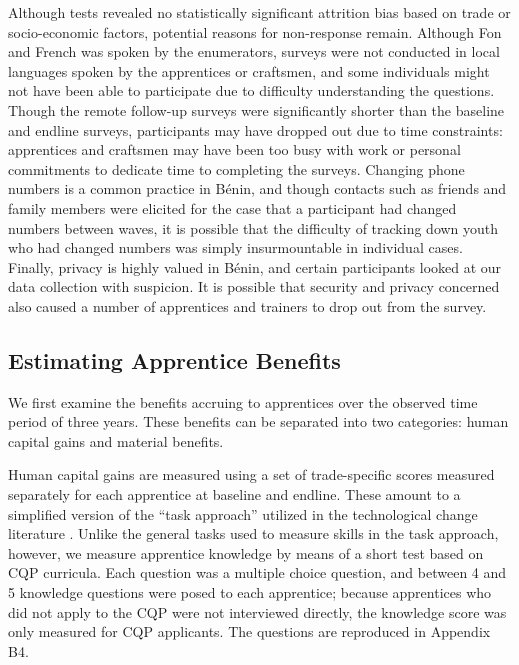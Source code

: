 \documentclass[
  a4paper, twoside, 12pt]{book}
\renewcommand{\hl}[1]{#1}
\begin{document}
\hl{Although tests revealed no statistically significant attrition bias based on trade or socio-economic factors, potential reasons for non-response remain. Although Fon and French was spoken by the enumerators, surveys were not conducted in local languages spoken by the apprentices or craftsmen, and some individuals might not have been able to participate due to difficulty understanding the questions. Though the remote follow-up surveys were significantly shorter than the baseline and endline surveys, participants may have dropped out due to time constraints: apprentices and craftsmen may have been too busy with work or personal commitments to dedicate time to completing the surveys. Changing phone numbers is a common practice in Bénin, and though contacts such as friends and family members were elicited for the case that a participant had changed numbers between waves, it is possible that the difficulty of tracking down youth who had changed numbers was simply insurmountable in individual cases. Finally, privacy is highly valued in Bénin, and certain participants looked at our data collection with suspicion. It is possible that security and privacy concerned also caused a number of apprentices and trainers to drop out from the survey.}

\hypertarget{appmethod}{%
\subsection{Estimating Apprentice Benefits}\label{appmethod}}

We first examine the benefits accruing to apprentices over the observed time period of three years. These benefits can be separated into two categories: human capital gains and material benefits.

Human capital gains are measured using a set of trade-specific scores measured separately for each apprentice at baseline and endline. These amount to a simplified version of the ``task approach'' utilized in the technological change literature \autocites[see][]{dicarlo2016,crepon2019}. Unlike the general tasks used to measure skills in the task approach, however, we measure apprentice knowledge by means of a short test based on CQP curricula. Each question was a multiple choice question, and between 4 and 5 knowledge questions were posed to each apprentice; because apprentices who did not apply to the CQP were not interviewed directly, the knowledge score was only measured for CQP applicants. The questions are reproduced in Appendix B4.
\end{document}
